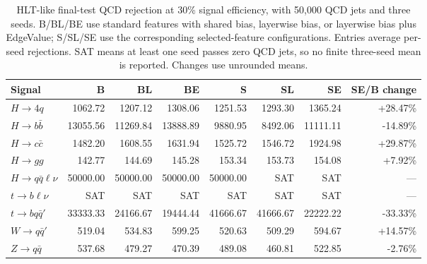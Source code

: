 \begin{table}[htbp]
\centering
\footnotesize
\setlength{\tabcolsep}{2.5pt}
\begin{tabularx}{\linewidth}{@{}Xrrrrrrr@{}}
\toprule
Signal & B & BL & BE & S & SL & SE & SE/B change \\
\midrule
$H\to4q$ & 1062.72 & 1207.12 & 1308.06 & 1251.53 & 1293.30 & 1365.24 & +28.47\% \\ %
$H\to b\bar b$ & 13055.56 & 11269.84 & 13888.89 & 9880.95 & 8492.06 & 11111.11 & -14.89\% \\ %
$H\to c\bar c$ & 1482.20 & 1608.55 & 1631.94 & 1525.72 & 1546.72 & 1924.98 & +29.87\% \\ %
$H\to gg$ & 142.77 & 144.69 & 145.28 & 153.34 & 153.73 & 154.08 & +7.92\% \\ %
$H\to q\bar q\ell\nu$ & 50000.00 & 50000.00 & 50000.00 & 50000.00 & SAT & SAT & --- \\ %
$t\to b\ell\nu$ & SAT & SAT & SAT & SAT & SAT & SAT & --- \\ %
$t\to bq\bar q'$ & 33333.33 & 24166.67 & 19444.44 & 41666.67 & 41666.67 & 22222.22 & -33.33\% \\ %
$W\to q\bar q'$ & 519.04 & 534.83 & 599.25 & 520.63 & 509.29 & 594.67 & +14.57\% \\ %
$Z\to q\bar q$ & 537.68 & 479.27 & 470.39 & 489.08 & 460.81 & 522.85 & -2.76\% \\ %
\bottomrule
\end{tabularx}
\caption{HLT-like final-test QCD rejection at 30\% signal efficiency,
with 50,000 QCD jets and three seeds. B/BL/BE use standard features with
shared bias, layerwise bias, or layerwise bias plus EdgeValue; S/SL/SE
use the corresponding selected-feature configurations. Entries average
per-seed rejections. SAT means at least one seed passes zero QCD jets,
so no finite three-seed mean is reported. Changes use unrounded means.}
\label{tab:hlt-rejection-30}
\end{table}
